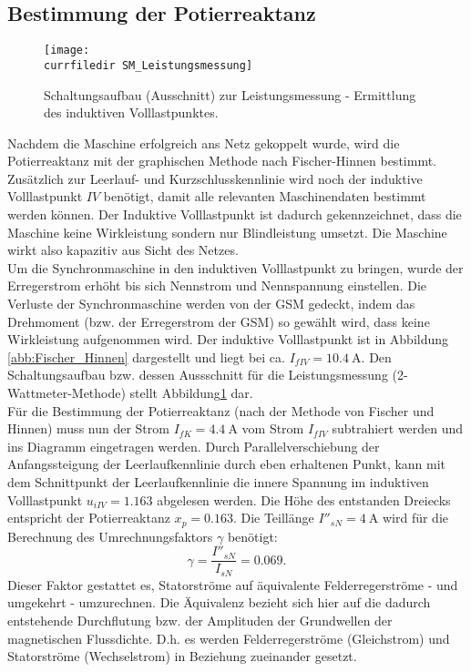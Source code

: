 \subsection{Bestimmung der Potierreaktanz}
\label{subsec:potierreaktanz}
\begin{figure}
    \centering
    \texttt{[image: \\currfiledir SM\_Leistungsmessung]}
    \caption{Schaltungsaufbau (Ausschnitt) zur Leistungsmessung - Ermittlung des induktiven Volllastpunktes.}
    \label{fig:SM_Leistungsmessung}
\end{figure}
Nachdem die Maschine erfolgreich ans Netz gekoppelt wurde, wird die Potierreaktanz mit der graphischen Methode nach Fischer-Hinnen bestimmt.\\
Zusätzlich zur Leerlauf- und Kurzschlusskennlinie wird noch der induktive Volllastpunkt $IV$ benötigt, damit alle relevanten Maschinendaten bestimmt werden können. Der Induktive Volllastpunkt ist dadurch gekennzeichnet, dass die Maschine keine Wirkleistung sondern nur Blindleistung umsetzt. Die Maschine wirkt also kapazitiv aus Sicht des Netzes.\\
Um die Synchronmaschine in den induktiven Volllastpunkt zu bringen, wurde der Erregerstrom erhöht bis sich Nennstrom und Nennspannung einstellen. Die Verluste der Synchronmaschine werden von der GSM gedeckt, indem das Drehmoment (bzw. der Erregerstrom der GSM) so gewählt wird, dass keine Wirkleistung aufgenommen wird. Der induktive Volllastpunkt ist in Abbildung \ref{abb:Fischer_Hinnen} dargestellt und liegt bei ca. $I_{fIV} = \SI{10.4}{\ampere}$. Den Schaltungsaufbau bzw. dessen Aussschnitt für die Leistungsmessung (2-Wattmeter-Methode) stellt Abbildung\;\ref{fig:SM_Leistungsmessung} dar.\\
Für die Bestimmung der Potierreaktanz (nach der Methode von Fischer und Hinnen) muss nun der Strom $I_{fK}= \SI{4.4}{\ampere}$ vom Strom $I_{fIV}$ subtrahiert werden und ins Diagramm eingetragen werden. Durch Parallelverschiebung der Anfangssteigung der Leerlaufkennlinie durch eben erhaltenen Punkt, kann mit dem Schnittpunkt der Leerlaufkennlinie die innere Spannung im induktiven Volllastpunkt $u_{iIV} = 1.163$ abgelesen werden. Die Höhe des entstanden Dreiecks entspricht der Potierreaktanz $x_p = 0.163$. Die Teillänge $I''_{sN}= \SI{4}{\ampere}$ wird für die Berechnung des Umrechnungsfaktors $\gamma$ benötigt:
\begin{equation*}
    \gamma = \frac{I''_{sN}}{I_{sN}} = 0.069.
\end{equation*}
Dieser Faktor gestattet es, Statorströme auf äquivalente Felderregerströme - und umgekehrt - umzurechnen. Die Äquivalenz bezieht sich hier auf die dadurch entstehende Durchflutung bzw. der Amplituden der Grundwellen der magnetischen Flussdichte. D.h. es werden Felderregerströme (Gleichstrom) und Statorströme (Wechselstrom) in Beziehung zueinander gesetzt.\\
